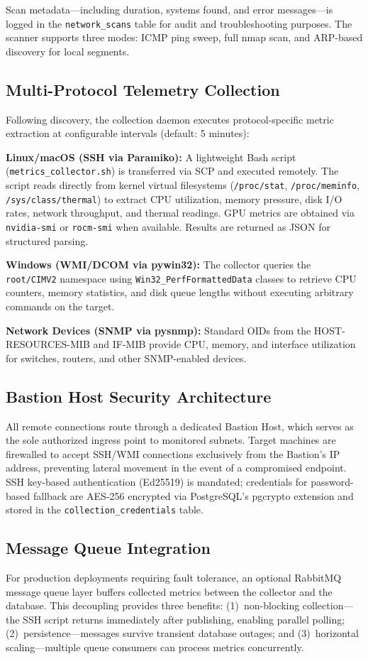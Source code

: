 \documentclass{ieeeaccess}
\begin{document}
Scan metadata---including duration, systems found, and error messages---is logged in the \texttt{network\_scans} table for audit and troubleshooting purposes. The scanner supports three modes: ICMP ping sweep, full nmap scan, and ARP-based discovery for local segments.

\subsection{Multi-Protocol Telemetry Collection}
Following discovery, the collection daemon executes protocol-specific metric extraction at configurable intervals (default: 5 minutes):

\textbf{Linux/macOS (SSH via Paramiko):} A lightweight Bash script (\texttt{metrics\_collector.sh}) is transferred via SCP and executed remotely. The script reads directly from kernel virtual filesystems (\texttt{/proc/stat}, \texttt{/proc/meminfo}, \texttt{/sys/class/thermal}) to extract CPU utilization, memory pressure, disk I/O rates, network throughput, and thermal readings. GPU metrics are obtained via \texttt{nvidia-smi} or \texttt{rocm-smi} when available. Results are returned as JSON for structured parsing.

\textbf{Windows (WMI/DCOM via pywin32):} The collector queries the \texttt{root/CIMV2} namespace using \texttt{Win32\_PerfFormattedData} classes to retrieve CPU counters, memory statistics, and disk queue lengths without executing arbitrary commands on the target.

\textbf{Network Devices (SNMP via pysnmp):} Standard OIDs from the HOST-RESOURCES-MIB and IF-MIB provide CPU, memory, and interface utilization for switches, routers, and other SNMP-enabled devices.

\subsection{Bastion Host Security Architecture}
All remote connections route through a dedicated Bastion Host, which serves as the sole authorized ingress point to monitored subnets. Target machines are firewalled to accept SSH/WMI connections exclusively from the Bastion's IP address, preventing lateral movement in the event of a compromised endpoint. SSH key-based authentication (Ed25519) is mandated; credentials for password-based fallback are AES-256 encrypted via PostgreSQL's pgcrypto extension and stored in the \texttt{collection\_credentials} table.

\subsection{Message Queue Integration}
For production deployments requiring fault tolerance, an optional RabbitMQ message queue layer buffers collected metrics between the collector and the database. This decoupling provides three benefits: (1)~non-blocking collection---the SSH script returns immediately after publishing, enabling parallel polling; (2)~persistence---messages survive transient database outages; and (3)~horizontal scaling---multiple queue consumers can process metrics concurrently.
\end{document}
